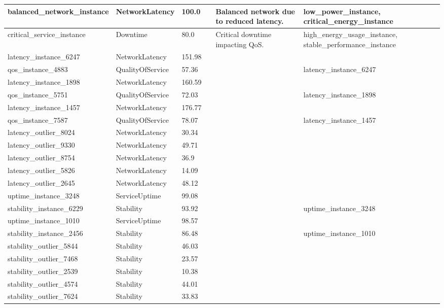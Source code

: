 \begin{longtable}{|l|p{2cm}|l|l|p{3cm}|p{3cm}|}
balanced\_network\_instance & NetworkLatency & 100.0 &  & Balanced network due to reduced latency. & low\_power\_instance, critical\_energy\_instance \\ \hline
critical\_service\_instance & Downtime & 80.0 &  & Critical downtime impacting QoS. & high\_energy\_usage\_instance, stable\_performance\_instance \\ \hline
latency\_instance\_6247 & NetworkLatency & 151.98 &  &  &  \\ \hline
qos\_instance\_4883 & QualityOfService & 57.36 &  &  & latency\_instance\_6247 \\ \hline
latency\_instance\_1898 & NetworkLatency & 160.59 &  &  &  \\ \hline
qos\_instance\_5751 & QualityOfService & 72.03 &  &  & latency\_instance\_1898 \\ \hline
latency\_instance\_1457 & NetworkLatency & 176.77 &  &  &  \\ \hline
qos\_instance\_7587 & QualityOfService & 78.07 &  &  & latency\_instance\_1457 \\ \hline
latency\_outlier\_8024 & NetworkLatency & 30.34 &  &  &  \\ \hline
latency\_outlier\_9330 & NetworkLatency & 49.71 &  &  &  \\ \hline
latency\_outlier\_8754 & NetworkLatency & 36.9 &  &  &  \\ \hline
latency\_outlier\_5826 & NetworkLatency & 14.09 &  &  &  \\ \hline
latency\_outlier\_2645 & NetworkLatency & 48.12 &  &  &  \\ \hline
uptime\_instance\_3248 & ServiceUptime & 99.08 &  &  &  \\ \hline
stability\_instance\_6229 & Stability & 93.92 &  &  & uptime\_instance\_3248 \\ \hline
uptime\_instance\_1010 & ServiceUptime & 98.57 &  &  &  \\ \hline
stability\_instance\_2456 & Stability & 86.48 &  &  & uptime\_instance\_1010 \\ \hline
stability\_outlier\_5844 & Stability & 46.03 &  &  &  \\ \hline
stability\_outlier\_7468 & Stability & 23.57 &  &  &  \\ \hline
stability\_outlier\_2539 & Stability & 10.38 &  &  &  \\ \hline
stability\_outlier\_4574 & Stability & 44.01 &  &  &  \\ \hline
stability\_outlier\_7624 & Stability & 33.83 &  &  &  \\ \hline

\end{longtable}
